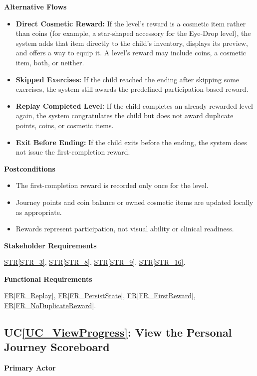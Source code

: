 \documentclass[10pt]{article}
\newcommand{\strref}[1]{\hyperref[#1]{STR\ref*{#1}}}
\newcounter{ucnum} %
\newcommand{\ucheading}[1]{UC\ref*{#1}}
\newcommand{\rref}[1]{\hyperref[#1]{FR\ref*{#1}}}
\begin{document}
\textbf{Alternative Flows}
\begin{itemize}
    \item \textbf{Direct Cosmetic Reward:} If the level's reward is
    a cosmetic item rather than coins (for example, a star-shaped
    accessory for the Eye-Drop level), the system adds that item
    directly to the child's inventory, displays its preview, and
    offers a way to equip it. A level's reward may include coins, a
    cosmetic item, both, or neither.
    \item \textbf{Skipped Exercises:} If the child reached the ending
    after skipping some exercises, the system still awards the
    predefined participation-based reward.
    \item \textbf{Replay Completed Level:} If the child completes an
    already rewarded level again, the system congratulates the child
    but does not award duplicate points, coins, or cosmetic items.
    \item \textbf{Exit Before Ending:} If the child exits before the
    ending, the system does not issue the first-completion reward.
\end{itemize}

\textbf{Postconditions}
\begin{itemize}
    \item The first-completion reward is recorded only once for
    the level.
    \item Journey points and coin balance or owned cosmetic items
    are updated locally as appropriate.
    \item Rewards represent participation, not visual ability
    or clinical readiness.
\end{itemize}

\textbf{Stakeholder Requirements}

\strref{STR_3}, \strref{STR_8}, \strref{STR_9}, \strref{STR_16}.

\textbf{Functional Requirements}

\rref{FR_Replay}, \rref{FR_PersistState}, \rref{FR_FirstReward}, \rref{FR_NoDuplicateReward}.

\label{UC_ViewProgress}
\subsection{\ucheading{UC_ViewProgress}: View the Personal Journey Scoreboard}

\textbf{Primary Actor}
\end{document}
